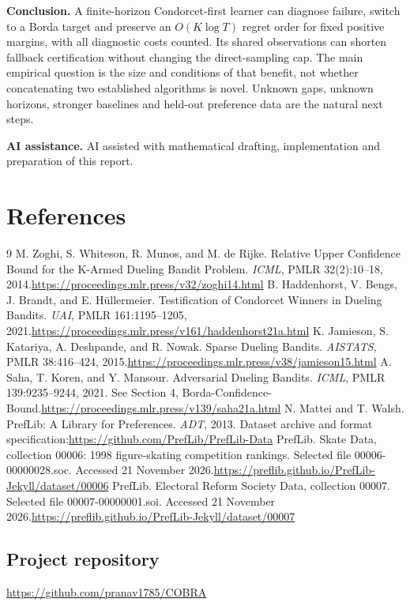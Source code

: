 \documentclass[11pt,a4paper]{article}
\begin{document}
\textbf{Conclusion.} A finite-horizon Condorcet-first learner can diagnose failure, switch to a Borda target and preserve an $O(K\log T)$ regret order for fixed positive margins, with all diagnostic costs counted. Its shared observations can shorten fallback certification without changing the direct-sampling cap. The main empirical question is the size and conditions of that benefit, not whether concatenating two established algorithms is novel. Unknown gaps, unknown horizons, stronger baselines and held-out preference data are the natural next steps.

\textbf{AI assistance.} AI assisted with mathematical drafting, implementation and preparation of this report.

\FloatBarrier\clearpage\section{References}

\begingroup
\renewcommand{\section}[2]{}%
\begin{thebibliography}{9}
 M. Zoghi, S. Whiteson, R. Munos, and M. de Rijke. Relative Upper Confidence Bound for the K-Armed Dueling Bandit Problem. \emph{ICML}, PMLR 32(2):10--18, 2014.\newline\url{https://proceedings.mlr.press/v32/zoghi14.html}
 B. Haddenhorst, V. Bengs, J. Brandt, and E. H\"ullermeier. Testification of Condorcet Winners in Dueling Bandits. \emph{UAI}, PMLR 161:1195--1205, 2021.\newline\url{https://proceedings.mlr.press/v161/haddenhorst21a.html}
 K. Jamieson, S. Katariya, A. Deshpande, and R. Nowak. Sparse Dueling Bandits. \emph{AISTATS}, PMLR 38:416--424, 2015.\newline\url{https://proceedings.mlr.press/v38/jamieson15.html}
 A. Saha, T. Koren, and Y. Mansour. Adversarial Dueling Bandits. \emph{ICML}, PMLR 139:9235--9244, 2021. See Section 4, Borda-Confidence-Bound.\newline\url{https://proceedings.mlr.press/v139/saha21a.html}
 N. Mattei and T. Walsh. PrefLib: A Library for Preferences. \emph{ADT}, 2013. Dataset archive and format specification:\newline\url{https://github.com/PrefLib/PrefLib-Data}
 PrefLib. Skate Data, collection 00006: 1998 figure-skating competition rankings. Selected file 00006-00000028.soc. Accessed 21 November 2026.\newline\url{https://preflib.github.io/PrefLib-Jekyll/dataset/00006}
 PrefLib. Electoral Reform Society Data, collection 00007. Selected file 00007-00000001.soi. Accessed 21 November 2026.\newline\url{https://preflib.github.io/PrefLib-Jekyll/dataset/00007}
\end{thebibliography}\endgroup

\subsection*{Project repository}\url{https://github.com/pranav1785/COBRA}
\end{document}
